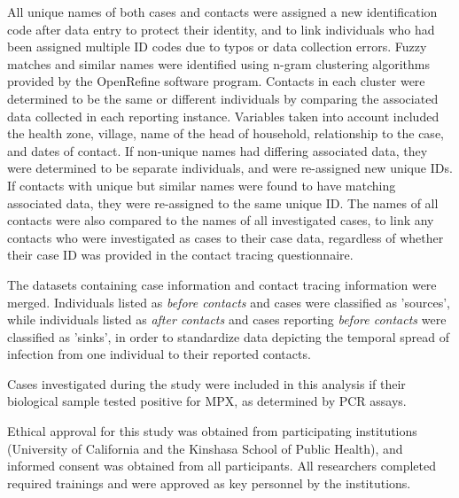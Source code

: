 All unique names of both cases and contacts were assigned a new identification code after data entry to protect their identity, and to link individuals who had been assigned multiple ID codes due to typos or data collection errors. Fuzzy matches and similar names were identified using n-gram clustering algorithms provided by the OpenRefine software program. Contacts in each cluster were determined to be the same or different individuals by comparing the associated data collected in each reporting instance. Variables taken into account included the health zone, village, name of the head of household, relationship to the case, and dates of contact. If non-unique names had differing associated data, they were determined to be separate individuals, and were re-assigned new unique IDs. If contacts with unique but similar names were found to have matching associated data, they were re-assigned to the same unique ID. The names of all contacts were also compared to the names of all investigated cases, to link any contacts who were investigated as cases to their case data, regardless of whether their case ID was provided in the contact tracing questionnaire.

The datasets containing case information and contact tracing information were merged. Individuals listed as \textit{before contacts} and cases were classified as 'sources', while individuals listed as \textit{after contacts} and cases reporting \textit{before contacts} were classified as 'sinks', in order to standardize data depicting the temporal spread of infection from one individual to their reported contacts.




Cases investigated during the study were included in this analysis if their biological sample tested positive for MPX, as determined by PCR assays. 

Ethical approval for this study was obtained from participating institutions (University of California and the Kinshasa School of Public Health), and informed consent was obtained from all participants. All researchers completed required trainings and were approved as key personnel by the institutions. 




